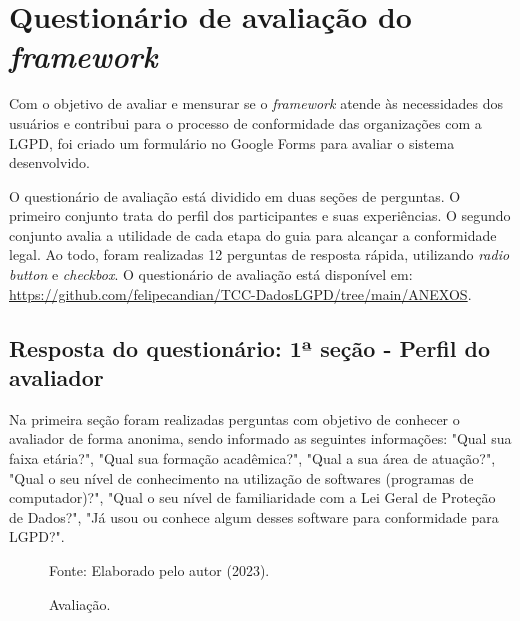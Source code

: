 \documentclass[
	12pt,				%
	openright,			%
	oneside,			%
	a4paper,			%
	english,			%
	french,				%
	spanish,			%
	brazil,				%
	]{abntex2}
\begin{document}
\section{Questionário de avaliação do \textit{framework} }

Com o objetivo de avaliar e mensurar se o \textit{framework} atende às necessidades dos usuários e contribui para o processo de conformidade das organizações com a LGPD, foi criado um formulário no Google Forms para avaliar o sistema desenvolvido.

O questionário de avaliação está dividido em duas seções de perguntas. O primeiro conjunto trata do perfil dos participantes e suas experiências. O segundo conjunto avalia a utilidade de cada etapa do guia para alcançar a conformidade legal. Ao todo, foram realizadas 12 perguntas de resposta rápida, utilizando \textit{radio button }e \textit{checkbox}. O questionário de avaliação está disponível em: \url{https://github.com/felipecandian/TCC-DadosLGPD/tree/main/ANEXOS}.

 
 \subsection{Resposta do questionário: 1ª seção - Perfil do avaliador}
 Na primeira seção foram realizadas perguntas com objetivo de conhecer o avaliador de forma anonima, sendo informado as seguintes informações: "Qual sua faixa etária?", "Qual sua formação acadêmica?", "Qual a sua área de atuação?", "Qual o seu nível de conhecimento na utilização de softwares (programas de computador)?", "Qual o seu nível de familiaridade com a Lei Geral de Proteção de Dados?", "Já usou ou conhece algum desses software para conformidade para LGPD?".
\pagebreak
 
\label{sec: resultados}

\begin{figure}[ht]
    \centering
    \caption{Avaliação.}
    \label{fig: grafico-acc}
    
    \centering \small Fonte: Elaborado pelo autor (2023).
\end{figure}
\end{document}
